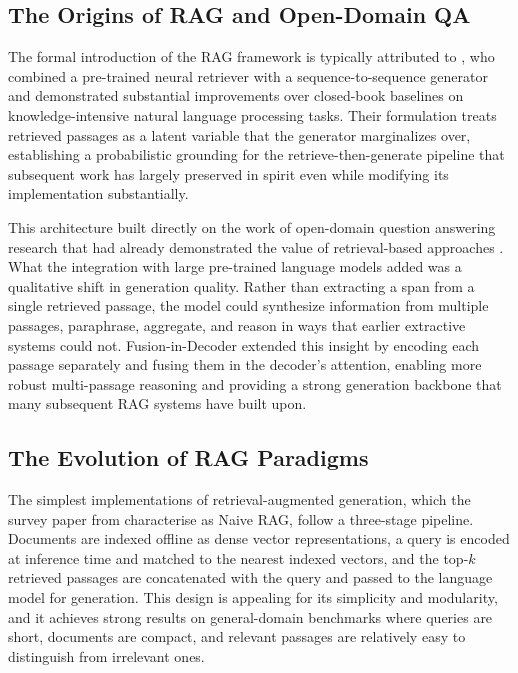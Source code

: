 \documentclass[12pt,twoside,maitrise]{dms}
\theoremstyle{definition}
\numberwithin{equation}{section}
\numberwithin{table}{chapter}
\numberwithin{figure}{chapter}
\begin{document}

\subsection{The Origins of RAG and Open-Domain QA}

The formal introduction of the RAG framework is typically attributed to
\citet{lewis2020retrieval}, who combined a pre-trained neural retriever with a
sequence-to-sequence generator and demonstrated substantial improvements over
closed-book baselines on knowledge-intensive natural language processing tasks. Their
formulation treats retrieved passages as a latent variable that the generator marginalizes
over, establishing a probabilistic grounding for the retrieve-then-generate pipeline that
subsequent work has largely preserved in spirit even while modifying its implementation
substantially.

This architecture built directly on the work of
open-domain question answering research that had already demonstrated the value of
retrieval-based approaches \citep{chen2017reading, lee2019latent}. What the integration
with large pre-trained language models added was a qualitative shift in generation
quality. Rather than extracting a span from a single retrieved passage, the model could
synthesize information from multiple passages, paraphrase, aggregate, and reason in ways
that earlier extractive systems could not. Fusion-in-Decoder
\citep{izacard2021leveraging} extended this insight by encoding each passage separately
and fusing them in the decoder's attention, enabling more robust multi-passage reasoning
and providing a strong generation backbone that many subsequent RAG systems have built
upon.

\subsection{The Evolution of RAG Paradigms}

The simplest implementations of retrieval-augmented generation, which the survey paper from
\citet{gao2023retrieval} characterise as Naive RAG, follow a three-stage pipeline.
Documents are indexed offline as dense vector representations, a query is encoded at
inference time and matched to the nearest indexed vectors, and the top-$k$ retrieved
passages are concatenated with the query and passed to the language model for generation.
This design is appealing for its simplicity and modularity, and it achieves strong
results on general-domain benchmarks where queries are short, documents are compact, and
relevant passages are relatively easy to distinguish from irrelevant ones.
\end{document}
